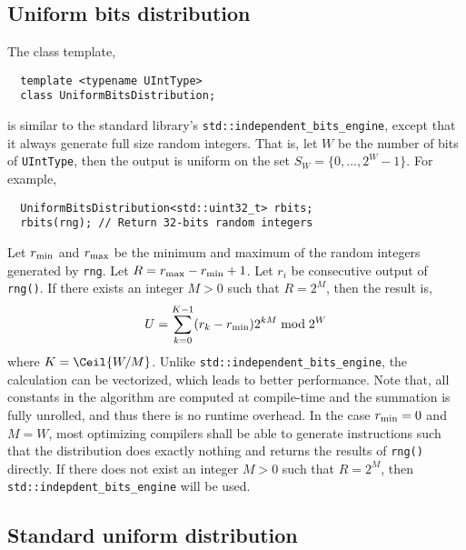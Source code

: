 \subsection{Uniform bits distribution}
\label{sub:Uniform bits distribution}

The class template,
\begin{Verbatim}
  template <typename UIntType>
  class UniformBitsDistribution;
\end{Verbatim}
is similar to the standard library's \verb|std::independent_bits_engine|,
except that it always generate full size random integers. That is, let $W$ be
the number of bits of \verb|UIntType|, then the output is uniform on the set
$S_W = \{0,\dots,2^W - 1\}$. For example,
\begin{Verbatim}
  UniformBitsDistribution<std::uint32_t> rbits;
  rbits(rng); // Return 32-bits random integers
\end{Verbatim}
Let $r_{\mathrm{min}}$ and $r_{\mathrm{max}}$ be the minimum and maximum of the random integers
generated by \verb|rng|. Let $R = r_{\mathrm{max}} - r_{\mathrm{min}} + 1$. Let $r_i$ be consecutive
output of \verb|rng()|. If there exists an integer $M > 0$ such that $R = 2^M$,
then the result is,
\begin{equation*}
  U = \sum_{k = 0}^{K - 1} (r_k - r_{\mathrm{min}}) 2^{kM} \bmod 2^W
\end{equation*}
where $K = \Ceil{W / M}$. Unlike \verb|std::independent_bits_engine|, the
calculation can be vectorized, which leads to better performance. Note that,
all constants in the algorithm are computed at compile-time and the summation
is fully unrolled, and thus there is no runtime overhead. In the case $r_{\mathrm{min}} =
0$ and $M = W$, most optimizing compilers shall be able to generate
instructions such that the distribution does exactly nothing and returns the
results of \verb|rng()| directly. If there does not exist an integer $M > 0$
such that $R = 2^M$, then \verb|std::indepdent_bits_engine| will be used.

\subsection{Standard uniform distribution}
\label{sub:Standard uniform distribution}

